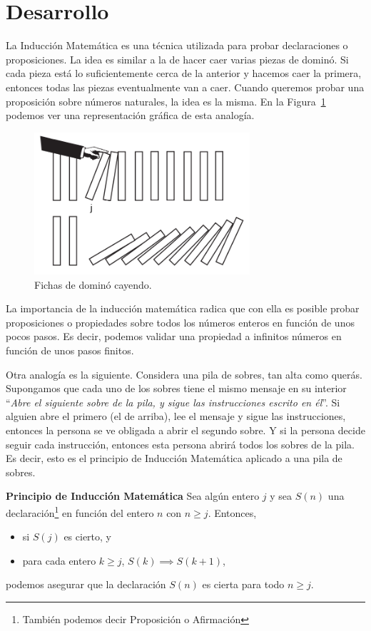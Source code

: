\section{Desarrollo}

La Inducción Matemática es una técnica utilizada para probar declaraciones o proposiciones.
La idea es similar a la de hacer caer varias piezas de dominó.
Si cada pieza está lo suficientemente cerca de la anterior y hacemos caer la primera, entonces todas las piezas eventualmente van a caer.
Cuando queremos probar una proposición sobre números naturales, la idea es la misma.
En la Figura~\ref{fig:figure} podemos ver una representación gráfica de esta analogía.

\begin{figure}[htb]
    \centering
    \includegraphics[width=8cm]{images/dominoes-fall}
    \caption{Fichas de dominó cayendo.}
    \label{fig:figure}
\end{figure}

La importancia de la inducción matemática radica que con ella es posible probar proposiciones o propiedades sobre todos los números enteros en función de unos pocos pasos.
Es decir, podemos validar una propiedad a infinitos números en función de unos pasos finitos.

Otra analogía es la siguiente.
Considera una pila de sobres, tan alta como querás.
Supongamos que cada uno de los sobres tiene el mismo mensaje en su interior ``\textit{Abre el siguiente sobre de la pila, y sigue las instrucciones escrito en él}''.
Si alguien abre el primero (el de arriba), lee el mensaje y sigue las instrucciones, entonces la persona se ve obligada a abrir el segundo sobre.
Y si la persona decide seguir cada instrucción, entonces esta persona abrirá todos los sobres de la pila.
Es decir, esto es el principio de Inducción Matemática aplicado a una pila de sobres.

\begin{principle.tcb}{\textbf{Principio de Inducción Matemática}}{}
    Sea algún entero $j$ y sea $S(n)$ una declaración\footnote{También podemos decir Proposición o Afirmación} en función del entero $n$ con $n \geq j$.
    Entonces,
    \begin{itemize}
        \item si $S(j)$ es cierto, y
        \item para cada entero $k \geq j$, $S(k) \implies S(k + 1)$,
    \end{itemize}
    podemos asegurar que la declaración $S(n)$ es cierta para todo $n \geq j$.
\end{principle.tcb}

